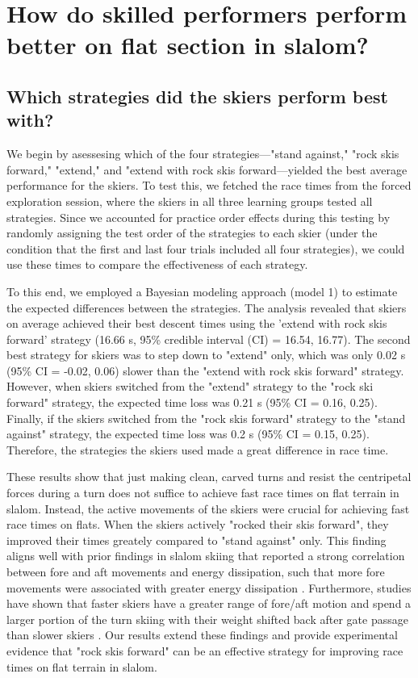 
\section{How do skilled performers perform better on flat section in slalom?}


\subsection{Which strategies did the skiers perform best with?}
We begin by asessesing which of the four strategies—"stand against," "rock skis forward," "extend," and "extend with rock skis forward—yielded the best average performance for the skiers. To test this, we fetched the race times from the forced exploration session, where the skiers in all three learning groups tested all strategies. Since we accounted for practice order effects during this testing by randomly assigning the test order of the strategies to each skier (under the condition that the first and last four trials included all four strategies), we could use these times to compare the effectiveness of each strategy.

To this end, we employed a Bayesian modeling approach (model 1) to estimate the expected differences between the strategies. The analysis revealed that skiers on average achieved their best descent times using the 'extend with rock skis forward' strategy (16.66 s, 95\% credible interval (CI) = 16.54, 16.77). The second best strategy for skiers was to step down to "extend" only, which was only 0.02 s (95\% CI = -0.02, 0.06) slower than the "extend with rock skis forward" strategy. However, when skiers switched from the "extend" strategy to the "rock ski forward" strategy, the expected time loss was 0.21 s (95\% CI = 0.16, 0.25). Finally, if the skiers switched from the "rock skis forward" strategy to the "stand against" strategy, the expected time loss was 0.2 s (95\% CI = 0.15, 0.25). Therefore, the strategies the skiers used made a great difference in race time.

These results show that just making clean, carved turns and resist the centripetal forces during a turn does not suffice to achieve fast race times on flat terrain in slalom. Instead, the active movements of the skiers were crucial for achieving fast race times on flats. When the skiers actively "rocked their skis forward", they improved their times greately compared to "stand against" only. This finding aligns well with prior findings in slalom skiing that reported a strong correlation between fore and aft movements and energy dissipation, such that more fore movements were associated with greater energy dissipation \cite{reid_turn_2009, reid_kinematic_2010}. Furthermore, studies have shown that faster skiers have a greater range of fore/aft motion and spend a larger portion of the turn skiing with their weight shifted back after gate passage than slower skiers \cite{tjorhom_beskrivelse_2007, reid_kinematic_2010}. Our results extend these findings and provide experimental evidence that "rock skis forward" can be an effective strategy for improving race times on flat terrain in slalom.

